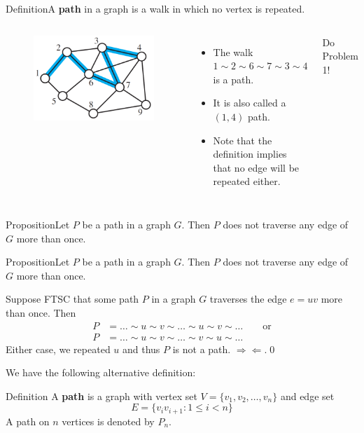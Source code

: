\documentclass{beamer}
\def\bl[#1]#2{\begin{block}{#1}#2\end{block}}
\def\itemb{\begin{itemize}}
\def\iteme{\end{itemize}}
\begin{document}
\begin{frame}
\bl[Definition]{A \textbf{path} in a graph is a walk in which no vertex is repeated.}
\begin{columns}
\begin{figure}
\centering
\includegraphics[scale=0.25]{PathGraph.pdf}
\end{figure}
\itemb
\item The walk $1\sim 2\sim 6\sim 7\sim 3\sim 4$ is a path.
\item It is also called a $(1,4)$ path.
\item Note that the definition implies that no edge will be repeated either.
\iteme
\begin{center}
Do Problem 1!
\end{center}
\end{columns}
\bl[Proposition]{Let $P$ be a path in a graph $G$. Then $P$ does not traverse any edge of $G$ more than once.}
\end{frame}

\begin{frame}
\bl[Proposition]{Let $P$ be a path in a graph $G$. Then $P$ does not traverse any edge of $G$ more than once.}
Suppose FTSC that some path $P$ in a graph $G$ traverses the edge $e=uv$ more than once. Then
\begin{align*}
P&=\dots\sim u\sim v\sim\dots\sim u\sim v\sim\dots\qquad\textrm{or}\\
P&=\dots\sim u\sim v\sim\dots\sim v\sim u\sim\dots
\end{align*}
Either case, we repeated $u$ and thus $P$ is not a path. $\Rightarrow\Leftarrow$.\qed\vspace{0.3cm}\pause

We have the following alternative definition:
\bl[Definition]{ A \textbf{path} is a graph with vertex set $V=\{v_1,v_2,\dots, v_n\}$ and edge set
\[
E=\{v_iv_{i+1}: 1\leq i<n\}
\]
A path on $n$ vertices is denoted by $P_n$.}
\end{frame}
\end{document}
